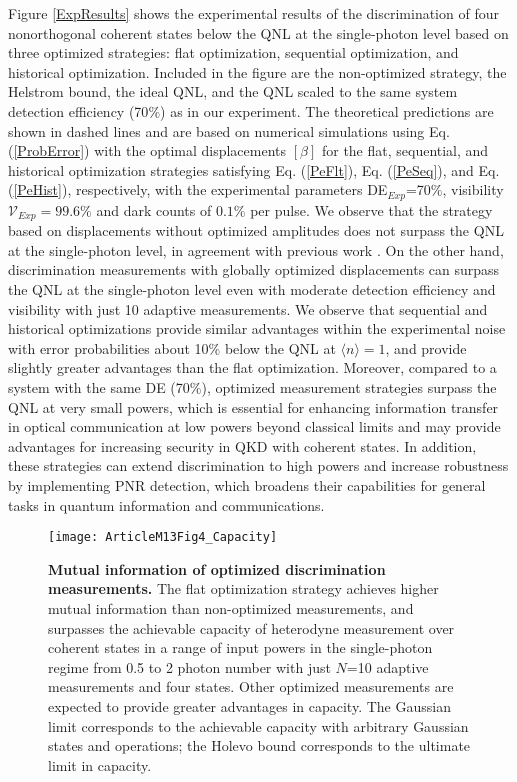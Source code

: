 \documentclass[twocolumn,pra,preprintnumbers,amsmath,amssymb,superscriptaddress,floatfix]{revtex4}%
\begin{document}
Figure \ref{ExpResults} shows the experimental results of the
discrimination of four nonorthogonal coherent states below the QNL
at the single-photon level based on three optimized strategies: flat optimization,
sequential optimization, and historical optimization. Included in the figure are
the non-optimized strategy, the Helstrom bound, the ideal QNL, and
the QNL scaled to the same system detection efficiency (70$\%$) as
in our experiment. The theoretical predictions are shown in dashed
lines and are based on numerical simulations using Eq.
(\ref{ProbError}) with the optimal displacements $[\beta]$ for
the flat, sequential, and historical
optimization strategies satisfying Eq. (\ref{PeFlt}), Eq. (\ref{PeSeq}), and Eq. (\ref{PeHist}),
respectively, with the experimental parameters DE$_{Exp}$=70$\%$,
visibility $\mathcal{V}_{Exp}=99.6\%$ and dark counts of $0.1\%$ per
pulse. We observe that the strategy based on displacements without
optimized amplitudes does not surpass the QNL at the single-photon
level, in agreement with previous work \cite{bondurant93, becerra11, becerra13,
muller12, muller15}. On the other hand, discrimination measurements
with globally optimized displacements can surpass the QNL at the
single-photon level even with moderate detection efficiency and
visibility with just 10 adaptive measurements. We observe that
sequential and historical optimizations provide similar advantages
within the experimental noise with error probabilities about 10$\%$
below the QNL at $\langle n\rangle=1$, and provide slightly greater
advantages than the flat optimization. Moreover, compared to a
system with the same DE (70$\%$), optimized measurement strategies
surpass the QNL at very small powers, which is essential for
enhancing information transfer in optical communication at low
powers beyond classical limits \cite{tan15, lee16, rosati16} and may
provide advantages for increasing security in QKD with coherent states. In addition, these
strategies can extend discrimination to high powers and increase
robustness by implementing PNR detection, which broadens their capabilities for
general tasks in quantum information and communications.

\begin{figure}[htbp]
\centering\texttt{[image: ArticleM13Fig4\_Capacity]}
\caption{\label{RScode} \textbf{Mutual information of optimized
discrimination measurements.} The flat optimization strategy achieves
higher mutual information than non-optimized measurements, and
surpasses the achievable capacity of heterodyne measurement over
coherent states in a range of input powers in the single-photon
regime from 0.5 to 2 photon number with just $N$=10 adaptive
measurements and four states. Other optimized measurements are
expected to provide greater advantages in capacity. The Gaussian
limit corresponds to the achievable capacity with arbitrary Gaussian states
and operations; the Holevo bound corresponds to the
ultimate limit in capacity.}
\end{figure}
\end{document}
